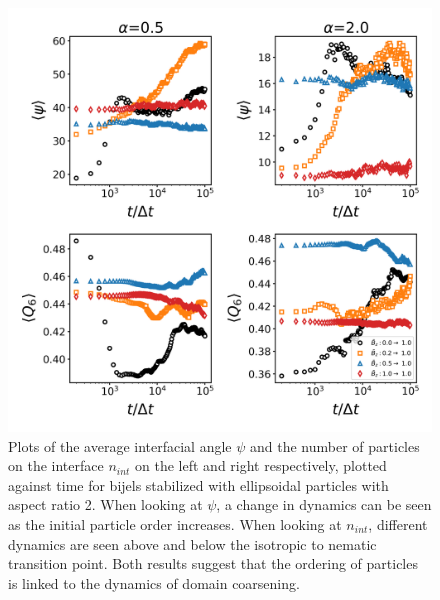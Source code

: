 \begin{figure} 
    \centering 
    \includegraphics[scale=0.4]{../figures/results/paper2/interface_angle-nint-field_up.png} 
    \caption{Plots of the average interfacial angle $\psi$ and the number of particles on the interface $n_{int}$ on the left and right respectively, 
             plotted against time for bijels stabilized with ellipsoidal particles with aspect ratio 2. When looking at $\psi$, a change in dynamics can be 
             seen as the initial particle order increases. When looking at $n_{int}$, different dynamics are seen above and below the isotropic to nematic transition point. 
             Both results suggest that the ordering of particles is linked to the dynamics of domain coarsening.} 
    \label{fig:interface_angle-nint-field_up} 
\end{figure}

